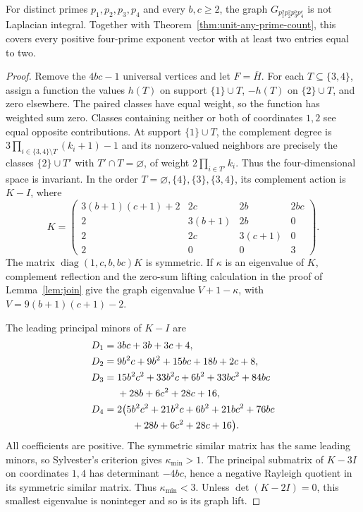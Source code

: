 \begin{theorem}
\label{thm:four-prime-pair-two}
For distinct primes $p_1,p_2,p_3,p_4$ and every $b,c\geq2$, the graph
$G_{p_1^2p_2^2p_3^bp_4^c}$ is not Laplacian integral.
Together with Theorem~\ref{thm:unit-any-prime-count}, this covers every
positive four-prime exponent vector with at least two entries equal to two.
\end{theorem}
\begin{proof}
Remove the $4bc-1$ universal vertices and let $F=\overline H$.
For each $T\subseteq\{3,4\}$, assign a function the values $h(T)$
on support $\{1\}\cup T$, $-h(T)$ on $\{2\}\cup T$, and zero elsewhere.
The paired classes have equal weight, so the function has weighted sum
zero. Classes containing neither or both of coordinates $1,2$ see
equal opposite contributions. At support $\{1\}\cup T$, the complement
degree is $3\prod_{i\in\{3,4\}\setminus T}(k_i+1)-1$ and its
nonzero-valued neighbors are precisely the classes $\{2\}\cup T'$
with $T'\cap T=\varnothing$, of weight $2\prod_{i\in T'}k_i$.
Thus the four-dimensional space is invariant. In the order
$T=\varnothing,\{4\},\{3\},\{3,4\}$, its complement action is $K-I$,
where
\[
K=\begin{pmatrix}
3(b+1)(c+1)+2&2c&2b&2bc\\
2&3(b+1)&2b&0\\
2&2c&3(c+1)&0\\
2&0&0&3
\end{pmatrix}.
\]
The matrix $\operatorname{diag}(1,c,b,bc)K$ is symmetric. If $\kappa$
is an eigenvalue of $K$, complement reflection and the zero-sum
lifting calculation in the proof of Lemma~\ref{lem:join}
give the graph eigenvalue $V+1-\kappa$, with $V=9(b+1)(c+1)-2$.

The leading principal minors of $K-I$ are
\begin{align*}
D_1={}&3bc+3b+3c+4,\\
D_2={}&9b^2c+9b^2+15bc+18b+2c+8,\\
D_3={}&15b^2c^2+33b^2c+6b^2+33bc^2+84bc\\
       &{}+28b+6c^2+28c+16,\\
D_4={}&2\bigl(5b^2c^2+21b^2c+6b^2+21bc^2+76bc\\
       &\hspace{1.5em}{}+28b+6c^2+28c+16\bigr).
\end{align*}
All coefficients are positive. The symmetric similar matrix has the
same leading minors, so Sylvester's criterion gives $\kappa_{\min}>1$.
The principal submatrix of $K-3I$ on coordinates $1,4$ has determinant
$-4bc$, hence a negative Rayleigh quotient in its symmetric similar
matrix. Thus $\kappa_{\min}<3$. Unless $\det(K-2I)=0$, this smallest
eigenvalue is noninteger and so is its graph lift.


\end{proof}
